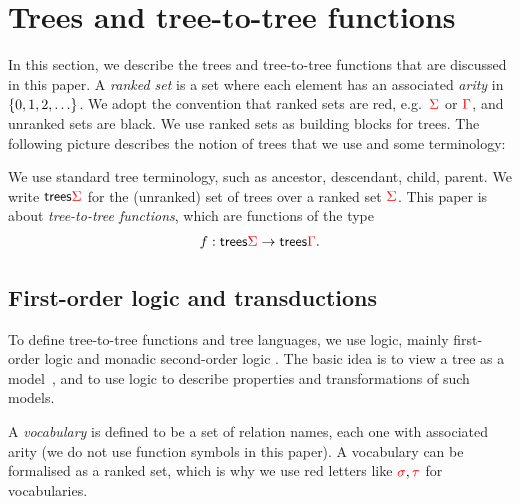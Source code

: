 \section{Trees and tree-to-tree functions}
\label{sec:trees-transductions}
 In this section, we describe the trees and tree-to-tree functions that are discussed in this paper. 
A \emph{ranked set} is a set where each element has an associated \emph{arity} in $\{0,1,2,\ldots\}$. We adopt the convention that ranked sets are red, e.g.~${\color{red}{\Sigma}}$ or ${\color{red}{\Gamma}}$, and unranked sets are black.  We use ranked sets as building blocks for trees. The following picture describes the notion of trees that we use and some terminology:


We use standard tree terminology, such as ancestor, descendant, child, parent. We write $\mathsf {trees} {\color{red}{\Sigma}}$ for the (unranked) set of trees over a ranked set ${\color{red}{\Sigma}}$. This paper is about \emph{tree-to-tree functions}, which are functions of the type \begin{align*}
f : \mathsf {trees} {\color{red}{\Sigma}} \to \mathsf {trees} {\color{red}{\Gamma}}.
\end{align*}

  
\subsection{First-order logic and transductions}
To define tree-to-tree functions and tree languages, we use  logic, mainly first-order logic and monadic second-order logic \mso. The basic idea is to view a tree as a model~\cite[Section 3]{thomas1997languages}, and to use logic to describe properties and transformations of such models.

A \emph{vocabulary} is defined to be a set of relation names, each one with associated arity (we do not use function symbols in this paper). A  vocabulary can be formalised as a ranked set, which is why we use red letters like ${\color{red}{\sigma}}, {\color{red}{\tau}}$ for  vocabularies. 

